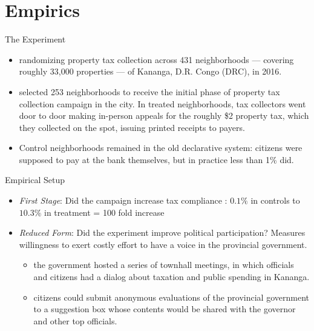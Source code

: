 \documentclass[12pt, aspectratio=169]{beamer}
\begin{document}


\section{Empirics}
\begin{frame}{The Experiment}

\begin{itemize}
\item randomizing property tax collection across 431 neighborhoods
— covering roughly 33,000 properties — of Kananga, D.R. Congo (DRC),
in 2016.
\item selected 253 neighborhoods to receive the initial phase of
property tax collection campaign in the city. In treated
neighborhoods, tax collectors went door to door making in-person
appeals for the roughly \$2 property tax, which they collected on the
spot, issuing printed receipts to payers.
\item Control neighborhoods remained in the old declarative system:
citizens were supposed to pay at the bank themselves, but in practice
less than 1\% did.
\end{itemize}

\end{frame}

\begin{frame}{Empirical Setup}

\begin{itemize}
\item \emph{First Stage}: Did the campaign increase tax compliance :
$0.1 \%$ in controls to $10.3 \%$ in treatment = 100 fold increase
\item \emph{Reduced Form}: Did the experiment improve political
participation? Measures willingness to exert costly effort to
have a voice in the provincial government.
  \begin{itemize}
  \item  the government hosted a series of townhall meetings, in which
  officials and citizens had a dialog about taxation and public
  spending in Kananga.
  \item citizens could submit anonymous evaluations of the provincial
  government to a suggestion box whose contents would be shared with
  the governor and other top officials.
  \end{itemize}
\end{itemize}

\end{frame}
\end{document}
